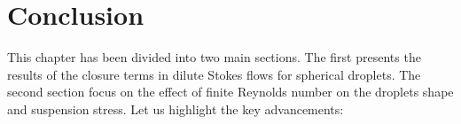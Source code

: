 \section{Conclusion}
This chapter has been divided into two main sections. 
The first presents the results of the closure terms in dilute Stokes flows for spherical droplets. 
The second section focus on the effect of finite Reynolds number on the droplets shape and suspension stress. 
Let us highlight the key advancements:
\begin{enumerate}

\end{enumerate}
